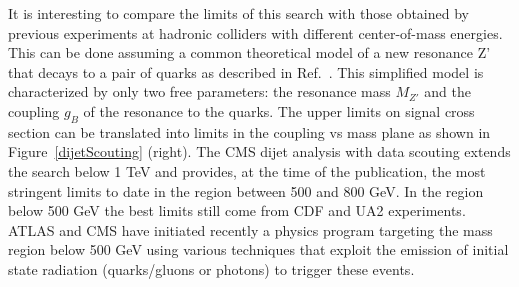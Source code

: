 \documentclass[epj]{webofc}
\begin{document}
It is interesting to compare the limits of this search with those obtained 
by previous experiments at hadronic colliders with different 
center-of-mass energies. This can be done assuming a common 
theoretical model of a new resonance Z' that decays to a
pair of quarks as described in Ref.~\cite{Dobrescu:2013coa}. This simplified model is characterized 
by only two free parameters: the resonance mass $M_{Z'}$ and the 
coupling $g_B$ of the resonance to the quarks. The upper 
limits on signal cross section can be translated into limits in the
coupling vs mass plane as shown in Figure~\ref{dijetScouting} (right). The CMS dijet analysis
with data scouting extends the search below 1 TeV and provides, at 
the time of the publication, the most stringent limits to date in the
region between 500 and 800 GeV. 
In the region below 500 GeV the best limits still come from 
CDF and UA2 experiments. ATLAS and CMS have initiated recently a
physics program targeting the mass region below 500 GeV using various
techniques that exploit the emission of initial state radiation
(quarks/gluons or photons) to trigger these events. 
%
\end{document}
